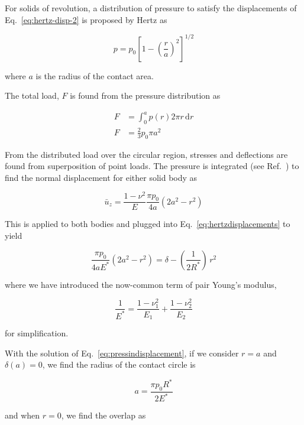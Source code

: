 For solids of revolution, a distribution of pressure to satisfy the displacements of Eq.~\ref{eq:hertz-disp-2} is proposed by Hertz as

\begin{equation}
	p = p_0 \left[1-\left(\frac{r}{a}\right)^2\right]^{1/2}
\end{equation}

where $a$ is the radius of the contact area.

The total load, $F$ is found from the pressure distribution as

\begin{align}
	F &= \int_0^a \! p(r) 2\pi r\, \mathrm{d}r \nonumber\\
	F & = \frac{2}{3} p_0 \pi a^2\label{eq:hertzforcewithpressure}
\end{align}

From the distributed load over the circular region, stresses and deflections are found from superposition of point loads. The pressure is integrated (see Ref.~\cite{Johnson1985}) to find the normal displacement for either solid body as

\begin{equation}
	\bar{u}_z = \frac{1-\nu^2}{E}\frac{\pi p_0}{4a}\left(2a^2 - r^2\right)
\end{equation}

This is applied to both bodies and plugged into Eq.~\ref{eq:hertzdisplacements} to yield

\begin{equation}\label{eq:pressindisplacement}
	\frac{\pi p_0}{4aE^*}\left(2a^2 - r^2\right) = \delta - \left(\frac{1}{2R^*}\right)\, r^2
\end{equation}

where we have introduced the now-common term of pair Young's modulus,

\begin{equation}
	\frac{1}{E^*} = \frac{1-\nu_1^2}{E_1} + \frac{1-\nu_2^2}{E_2}
\end{equation}

for simplification.

With the solution of Eq.~\ref{eq:pressindisplacement}, if we consider $r = a$ and $\delta(a) = 0$, we find the radius of the contact circle is

\begin{equation}\label{eq:hertz-radius}
	a = \frac{\pi p_0 R^*}{2E^*}
\end{equation}

and when $r= 0$, we find the overlap as

